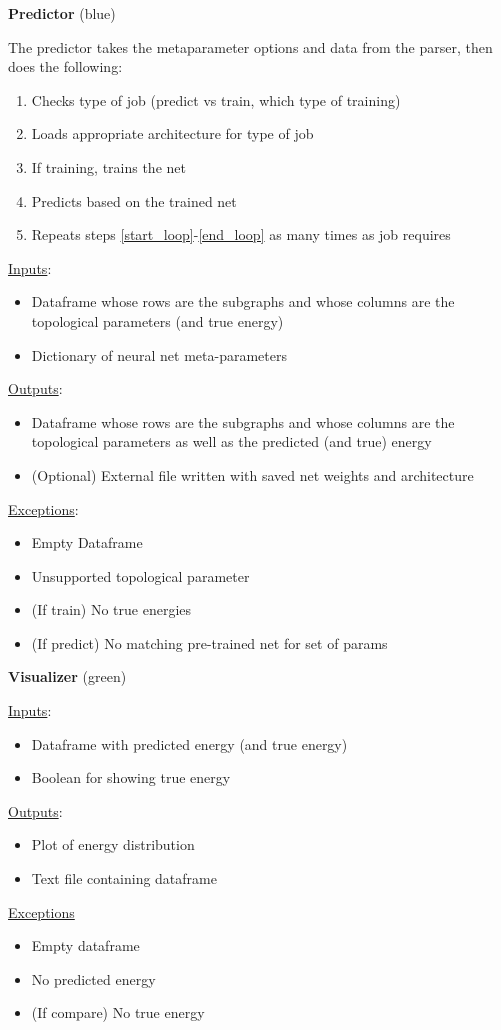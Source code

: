 \documentclass[paper=a4, fontsize=12pt]{article}
\begin{document}
{\noindent \large \textbf{Predictor} (blue)}

The predictor takes the metaparameter options and data from the parser,
then does the following:

\begin{enumerate}
  \item Checks type of job (predict vs train, which type of training)
  \item Loads appropriate architecture for type of job \label{start_loop}
  \item If training, trains the net
  \item Predicts based on the trained net \label{end_loop}
  \item Repeats steps \ref{start_loop}-\ref{end_loop} as many times as job requires
\end{enumerate}

\underline{Inputs}:
\begin{itemize}
  \item Dataframe whose rows are the subgraphs and whose columns are the
		  topological parameters (and true energy)
  \item Dictionary of neural net meta-parameters
\end{itemize}

\underline{Outputs}:
\begin{itemize}
  \item Dataframe whose rows are the subgraphs and whose columns are the topological parameters as well as the predicted (and true) energy
  \item (Optional) External file written with saved net weights and architecture
\end{itemize}

\underline{Exceptions}:
\begin{itemize}
  \item Empty Dataframe
  \item Unsupported topological parameter
  \item (If train) No true energies
  \item (If predict) No matching pre-trained net for set of params
\end{itemize}

{\noindent \large \textbf{Visualizer} (green)}

\underline{Inputs}:
\begin{itemize}
  \item Dataframe with predicted energy (and true energy)
  \item Boolean for showing true energy
\end{itemize}

\underline{Outputs}:
\begin{itemize}
  \item Plot of energy distribution
  \item Text file containing dataframe
\end{itemize}

\underline{Exceptions}
\begin{itemize}
  \item Empty dataframe
  \item No predicted energy
  \item (If compare) No true energy
\end{itemize}
\end{document}
